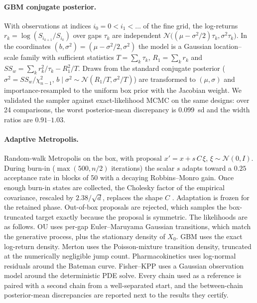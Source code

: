 \documentclass[10pt]{article}
\newcommand{\N}{\mathcal{N}}
\begin{document}
\paragraph{GBM conjugate posterior.} With observations at indices $i_0 = 0 < i_1 < \dots$ of the fine
grid, the log-returns $r_k = \log(S_{i_{k+1}}/S_{i_k})$ over gaps $\tau_k$ are independent
$\N\bigl((\mu - \sigma^2/2)\tau_k, \sigma^2 \tau_k\bigr)$. In the coordinates
$(b, \sigma^2) = (\mu - \sigma^2/2, \sigma^2)$ the model is a Gaussian location--scale family with
sufficient statistics $T = \sum_k \tau_k$, $R_1 = \sum_k r_k$ and
$SS_w = \sum_k r_k^2 / \tau_k - R_1^2 / T$. Draws from the standard conjugate posterior
($\sigma^2 = SS_w / \chi^2_{n-1}$, $b \mid \sigma^2 \sim \N(R_1/T, \sigma^2/T)$) are transformed to
$(\mu, \sigma)$ and importance-resampled to the uniform box prior with the Jacobian weight. We
validated the sampler against exact-likelihood MCMC on the same designs: over 24 comparisons, the
worst posterior-mean discrepancy is $0.099$~sd and the width ratios are $0.91$--$1.03$.

\paragraph{Adaptive Metropolis.} Random-walk Metropolis on the box, with proposal
$x' = x + s\,C\,\xi$, $\xi \sim \N(0, I)$. During burn-in ($\max(500, n/2)$ iterations) the scalar $s$
adapts toward a $0.25$ acceptance rate in blocks of 50 with a decaying Robbins--Monro gain. Once
enough burn-in states are collected, the Cholesky factor of the empirical covariance, rescaled by
$2.38/\sqrt{d}$, replaces the shape $C$ \citep{haario2001}. Adaptation is frozen for the retained
phase. Out-of-box proposals are rejected, which samples the box-truncated target exactly because the
proposal is symmetric. The likelihoods are as follows. OU uses per-gap Euler--Maruyama Gaussian
transitions, which match the generative process, plus the stationary density of $X_0$. GBM uses the
exact log-return density. Merton uses the Poisson-mixture transition density, truncated at the
numerically negligible jump count. Pharmacokinetics uses log-normal residuals around the Bateman
curve. Fisher--KPP uses a Gaussian observation model around the deterministic PDE solve. Every chain
used as a reference is paired with a second chain from a well-separated start, and the between-chain
posterior-mean discrepancies are reported next to the results they certify.
\end{document}
